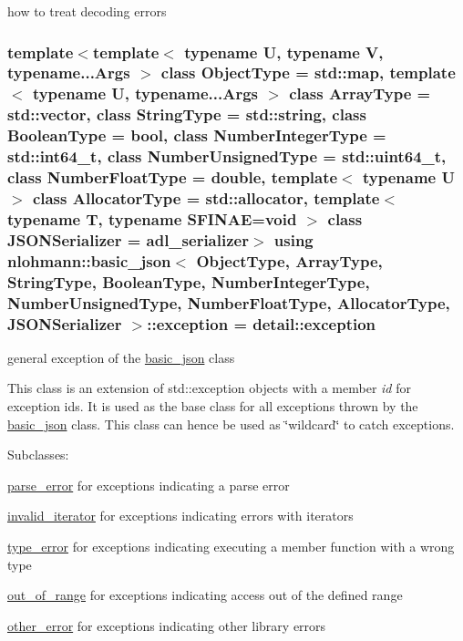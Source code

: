 how to treat decoding errors 

\subsubsection[{\texorpdfstring{exception}{exception}}]{\setlength{\rightskip}{0pt plus 5cm}template$<$template$<$ typename U, typename V, typename...\+Args $>$ class Object\+Type = std\+::map, template$<$ typename U, typename...\+Args $>$ class Array\+Type = std\+::vector, class String\+Type  = std\+::string, class Boolean\+Type  = bool, class Number\+Integer\+Type  = std\+::int64\+\_\+t, class Number\+Unsigned\+Type  = std\+::uint64\+\_\+t, class Number\+Float\+Type  = double, template$<$ typename U $>$ class Allocator\+Type = std\+::allocator, template$<$ typename T, typename S\+F\+I\+N\+A\+E=void $>$ class J\+S\+O\+N\+Serializer = adl\+\_\+serializer$>$ using {\bf nlohmann\+::basic\+\_\+json}$<$ Object\+Type, Array\+Type, String\+Type, Boolean\+Type, Number\+Integer\+Type, Number\+Unsigned\+Type, Number\+Float\+Type, Allocator\+Type, J\+S\+O\+N\+Serializer $>$\+::{\bf exception} =  {\bf detail\+::exception}}\hypertarget{classnlohmann_1_1basic__json_a9a0aced019cb1d65bb49703406c84970}{}\label{classnlohmann_1_1basic__json_a9a0aced019cb1d65bb49703406c84970}


general exception of the \hyperlink{classnlohmann_1_1basic__json}{basic\+\_\+json} class 

This class is an extension of {\ttfamily std\+::exception} objects with a member {\itshape id} for exception ids. It is used as the base class for all exceptions thrown by the \hyperlink{classnlohmann_1_1basic__json}{basic\+\_\+json} class. This class can hence be used as \char`\"{}wildcard\char`\"{} to catch exceptions.

Subclasses\+:
\begin{DoxyItemize}
\item \hyperlink{classnlohmann_1_1basic__json_af1efc2468e6022be6e35fc2944cabe4d}{parse\+\_\+error} for exceptions indicating a parse error
\item \hyperlink{classnlohmann_1_1basic__json_ac13d32f7cbd02d616e71d8dc30dadcbf}{invalid\+\_\+iterator} for exceptions indicating errors with iterators
\item \hyperlink{classnlohmann_1_1basic__json_a4010e8e268fefd86da773c10318f2902}{type\+\_\+error} for exceptions indicating executing a member function with a wrong type
\item \hyperlink{classnlohmann_1_1basic__json_a28f7c2f087274a0012eb7a2333ee1580}{out\+\_\+of\+\_\+range} for exceptions indicating access out of the defined range
\item \hyperlink{classnlohmann_1_1basic__json_a3333a5a8714912adda33a35b369f7b3d}{other\+\_\+error} for exceptions indicating other library errors
\end{DoxyItemize}

